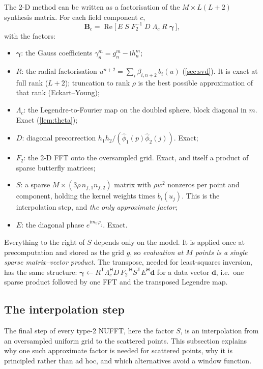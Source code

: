 \documentclass[11pt,a4paper]{article}
\theoremstyle{remark}
\renewcommand{\Re}{\operatorname{Re}}
\begin{document}
The 2-D method can be written as a factorisation of the $M\times L(L+2)$ synthesis matrix. For each
field component $c$,
\begin{equation}\label{eq:factor}
\mathbf B_c=\Re\big[\,E\;S\;F_2^{-1}\;D\;\Lambda_c\;R\;\boldsymbol\gamma\,\big],
\end{equation}
with the factors:
\begin{itemize}
\item $\boldsymbol\gamma$: the Gauss coefficients $\gamma_n^m=g_n^m-\mathrm ih_n^m$;
\item $R$: the radial factorisation $u^{n+2}=\sum_i\beta_{i,n+2}\,b_i(u)$ (\cref{sec:svd}). It is exact at full rank ($L+2$);
  truncation to rank $\rho$ is the best possible approximation of that rank (Eckart--Young);
\item $\Lambda_c$: the Legendre-to-Fourier map on the doubled sphere, block diagonal in $m$. Exact (\cref{lem:theta});
\item $D$: diagonal precorrection $h_1h_2/(\hat\phi_1(p)\hat\phi_2(j))$. Exact;
\item $F_2$: the 2-D FFT onto the oversampled grid. Exact, and itself a product of sparse butterfly matrices;
\item $S$: a sparse $M\times(3\rho\,n_{f,1}n_{f,2})$ matrix with $\rho w^2$ nonzeros per point and component,
  holding the kernel weights times $b_i(u_j)$. This is the interpolation step, and \emph{the only approximate factor};
\item $E$: the diagonal phase $e^{\mathrm im_0\varphi_j}$. Exact.
\end{itemize}
Everything to the right of $S$ depends only on the model. It is applied once at precomputation and stored as the grid
$g$, so \emph{evaluation at $M$ points is a single sparse matrix--vector product}. The transpose, needed for
least-squares inversion, has the same structure:
$\boldsymbol\gamma\leftarrow R^{\mathsf T}\Lambda_c^{\mathsf H}D\,F_2^{-\mathsf H}S^{\mathsf T}E^{\mathsf H}\mathbf d$ for a data vector $\mathbf d$,
i.e.\ one sparse product followed by one FFT and the transposed Legendre map.

\subsection{The interpolation step}\label{sec:interp}

The final step of every type-2 NUFFT, here the factor $S$, is an interpolation from an oversampled uniform grid
to the scattered points. This subsection explains why one such approximate factor is needed for scattered
points, why it is principled rather than ad hoc, and which alternatives avoid a window function.
\end{document}
